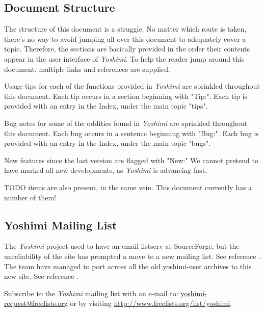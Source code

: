 \documentclass[
 11pt,
 twoside,
 a4paper,
 final                                 %
]{article}
\begin{document}
\subsection{Document Structure}
\label{subsec:introduction_document_structure}

   The structure of this document is a struggle.  No matter which route is
   taken, there's no way to avoid jumping all over this document to
   adequately cover a topic.  Therefore, the sections are basically provided
   in the order their contents appear in the user interface of
   \textsl{Yoshimi}.  To help the reader jump around this document, multiple
   links and references are supplied.

   Usage tips
   for each of the functions provided in
   \textsl{Yoshimi} are sprinkled throughout this document.
   Each tip occurs in a section beginning with "Tip:".
   Each tip is provided with an entry in the Index, under the
   main topic "tips".

   Bug notes
   for some of the oddities found in \textsl{Yoshimi} are
   sprinkled throughout this document.
   Each bug occurs in a sentence beginning with "Bug:".
   Each bug is provided with an entry in the Index, under the
   main topic "bugs".

   New features
   since the last version are flagged with "New:"  We cannot pretend to have
   marked all new developments, as \textsl{Yoshimi} is advancing fast.

   TODO items are also present, in the same vein.  This document currently has
   a number of them!

\subsection{Yoshimi Mailing List}
\label{subsec:introduction_mailing_list}

   The \textsl{Yoshimi} project used to have an email listserv at
   SourceForge, but the unreliability of the site has prompted a move to a
   new mailing list.  See reference \cite{yoshiminews}.  The team have
   managed to port across all the old yoshimi-user archives to this new
   site.  See reference \cite{yoshiminewsarchive}.

   Subscribe to the \textsl{Yoshimi} mailing list with an e-mail to:
   \url{yoshimi-request@freelists.org} or by visiting 
   \url{http://www.freelists.org/list/yoshimi}.
\end{document}
